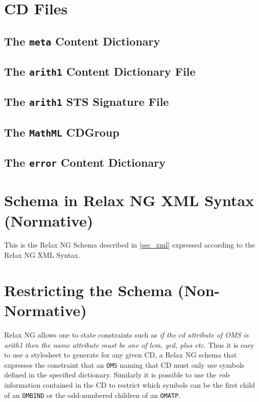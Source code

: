 \begin{appendix}
\chapter{CD Files}\label{app_cdfiles}

\section{The \texttt{meta} Content Dictionary}\label{app_cdcd}


\section{The  \texttt{arith1} Content Dictionary File}\label{arith1.ocd}


\section{The  \texttt{arith1} STS Signature File}\label{arith1.sts}


\section{The  \texttt{MathML} CDGroup}\label{mathml.cdg}


\section{The \texttt{error} Content Dictionary}\label{errorcd}


\chapter{\OM Schema in Relax NG XML Syntax (Normative)}\label{app_openmath.rng}

This is the Relax NG Schema described in \ref{sec_xml} expressed according to the Relax NG
XML Syntax.



\chapter{Restricting the \OM Schema (Non-Normative)}\label{app_relaxrestricted}
Relax NG allows one to state constraints such as \emph{if the cd attribute of OMS is
arith1 then the name attribute must be one of lcm, gcd, plus etc.} Thus it is
easy to use a stylesheet to generate for any given CD, a Relax NG schema that expresses
the constraint that an \lstinline|OMS| naming that CD must only use symbols defined in
the specified dictionary.  Similarly it is possible to use the \emph{role} information
contained in the CD to restrict which symbols can be the first child of an
\lstinline|OMBIND| or the odd-numbered children of an \lstinline|OMATP|.
  

\end{appendix}
